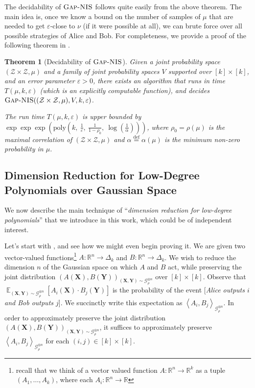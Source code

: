 \documentclass[11pt]{article}
\newcommand{\inparen}[1]{\left ( #1 \right )}
\newcommand{\inangle}[1]{\left \langle #1 \right \rangle}
\newcommand{\defeq}{\stackrel{\mathrm{def}}{=}}
\DeclareMathOperator*{\Ex}{\mathbb{E}}
\newcommand{\eps}{\varepsilon}
\newcommand{\bbR}{{\mathbb R}}
\newcommand{\bX}{\mathbf{X}}
\newcommand{\bY}{\mathbf{Y}}
\newcommand{\calG}{\mathcal{G}}
\newcommand{\calZ}{\mathcal{Z}}
\newcommand{\poly}{\mathrm{poly}}
\newtheorem{theorem}{Theorem}[section]
\newcommand{\ANIS}{\text{\sc Gap-NIS}}
\begin{document}
\noindent The decidability of $\ANIS$ follows quite easily from the above theorem. The main idea is, once we know a bound on the number of samples of $\mu$ that are needed to get $\eps$-close to $\nu$ (if it were possible at all), we can brute force over all possible strategies of Alice and Bob. For completeness, we provide a proof of the following theorem in .

\begin{theorem}[Decidability of $\ANIS$] \label{thm:decidability}
	Given a joint probability space $(\calZ \times \calZ, \mu)$ and a family of joint probability spaces $V$ supported over $[k] \times [k]$, and an error parameter $\eps > 0$, there exists an algorithm that runs in time $T(\mu, k, \eps)$ (which is an explicitly computable function), and decides $\ANIS((\calZ \times \calZ, \mu), V, k, \eps)$.
	
	\noindent The run time $T(\mu, k, \eps)$ is upper bounded by $\exp\exp\exp\inparen{\poly\inparen{k, \ \frac{1}{\eps}, \ \frac{1}{1-\rho_0}, \ \log\inparen{\frac{1}{\alpha}}}}$,
	where $\rho_0 = \rho(\mu)$ is the maximal correlation of $(\calZ \times \calZ, \mu)$ and $\alpha \defeq \alpha(\mu)$ is the minimum non-zero probability in $\mu$.
\end{theorem}

\subsection{Dimension Reduction for Low-Degree Polynomials over Gaussian Space} \label{subsec:dimred}

We now describe the main technique of ``{\em dimension reduction for low-degree polynomials}'' that we introduce in this work, which could be of independent interest. 

Let's start with , and see how we might even begin proving it. We are given two vector-valued functions\footnote{recall that we think of a vector valued function $A : \bbR^n \to \bbR^k$ as a tuple $(A_1, \ldots, A_k)$, where each $A_i : \bbR^n \to \bbR$} $A: \bbR^n \to \Delta_k$ and $B: \bbR^n \to \Delta_k$. We wish to reduce the dimension $n$ of the Gaussian space on which $A$ and $B$ act, while preserving the joint distribution $(A(\bX), B(\bY))_{(\bX, \bY) \sim \calG_\rho^{\otimes n}}$ over $[k] \times [k]$. Observe that $\Ex_{(\bX, \bY) \sim \calG_\rho^{\otimes n}} [A_i(\bX) \cdot B_j(\bY)]$ is the probability of the event [{\em Alice outputs $i$ and Bob outputs $j$}]. We succinctly write this expectation as $\inangle{A_i, B_j}_{\calG_\rho^{\otimes n}}$. In order to approximately preserve the joint distribution $(A(\bX), B(\bY))_{(\bX, \bY) \sim \calG_\rho^{\otimes n}}$, it suffices to approximately preserve $\inangle{A_i, B_j}_{\calG_\rho^{\otimes n}}$ for each $(i, j) \in [k] \times [k]$.
\end{document}
